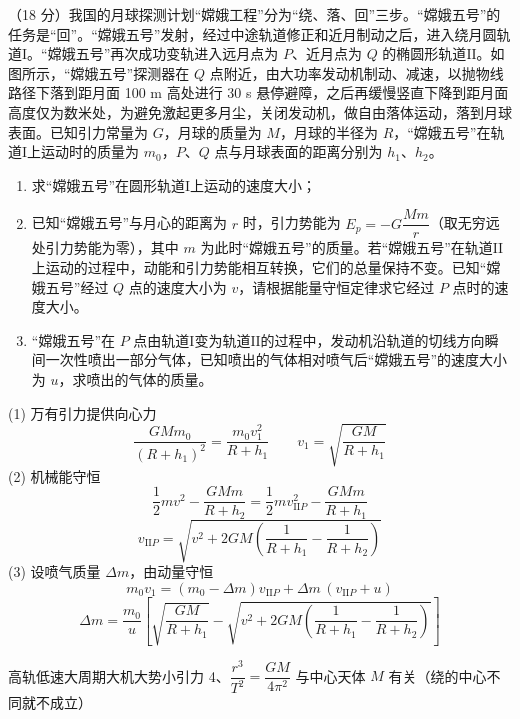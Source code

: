 \begin{problem}
（18 分）我国的月球探测计划“嫦娥工程”分为“绕、落、回”三步。“嫦娥五号”的任务是“回”。“嫦娥五号”发射，经过中途轨道修正和近月制动之后，进入绕月圆轨道$\mathrm{I}$。“嫦娥五号”再次成功变轨进入远月点为 $P$、近月点为 $Q$ 的椭圆形轨道$\mathrm{II}$。如图所示，“嫦娥五号”探测器在 $Q$ 点附近，由大功率发动机制动、减速，以抛物线路径下落到距月面 100 m 高处进行 30 s 悬停避障，之后再缓慢竖直下降到距月面高度仅为数米处，为避免激起更多月尘，关闭发动机，做自由落体运动，落到月球表面。已知引力常量为 $G$，月球的质量为 $M$，月球的半径为 $R$，“嫦娥五号”在轨道$\mathrm{I}$上运动时的质量为 $m_0$，$P$、$Q$ 点与月球表面的距离分别为 $h_1$、$h_2$。
\begin{enumerate}[label=(\arabic*),leftmargin=2.5em,itemsep=0pt]
\item 求“嫦娥五号”在圆形轨道$\mathrm{I}$上运动的速度大小；
\item 已知“嫦娥五号”与月心的距离为 $r$ 时，引力势能为 $E_p=-G\dfrac{Mm}{r}$（取无穷远处引力势能为零），其中 $m$ 为此时“嫦娥五号”的质量。若“嫦娥五号”在轨道$\mathrm{II}$上运动的过程中，动能和引力势能相互转换，它们的总量保持不变。已知“嫦娥五号”经过 $Q$ 点的速度大小为 $v$，请根据能量守恒定律求它经过 $P$ 点时的速度大小。
\item “嫦娥五号”在 $P$ 点由轨道$\mathrm{I}$变为轨道$\mathrm{II}$的过程中，发动机沿轨道的切线方向瞬间一次性喷出一部分气体，已知喷出的气体相对喷气后“嫦娥五号”的速度大小为 $u$，求喷出的气体的质量。
\end{enumerate}
\begin{solution}
(1) 万有引力提供向心力
\[
\frac{GMm_0}{(R+h_1)^2}=\frac{m_0v_1^2}{R+h_1}\qquad v_1=\sqrt{\frac{GM}{R+h_1}}
\]
(2) 机械能守恒
\[
\frac{1}{2}mv^2-\frac{GMm}{R+h_2}=\frac{1}{2}mv_{\mathrm{II}P}^2-\frac{GMm}{R+h_1}
\]
\[
v_{\mathrm{II}P}=\sqrt{v^2+2GM\left(\frac{1}{R+h_1}-\frac{1}{R+h_2}\right)}
\]
(3) 设喷气质量 $\Delta m$，由动量守恒
\[
m_0v_1=(m_0-\Delta m)v_{\mathrm{II}P}+\Delta m\,(v_{\mathrm{II}P}+u)
\]
\[
\Delta m=\frac{m_0}{u}\left[\sqrt{\frac{GM}{R+h_1}}-\sqrt{v^2+2GM\left(\frac{1}{R+h_1}-\frac{1}{R+h_2}\right)}\right]
\]
\end{solution}
\end{problem}
高轨低速大周期大机大势小引力%
4、$\dfrac{r^3}{T^2}=\dfrac{GM}{4\pi^2}$ 与中心天体 $M$ 有关（绕的中心不同就不成立）

